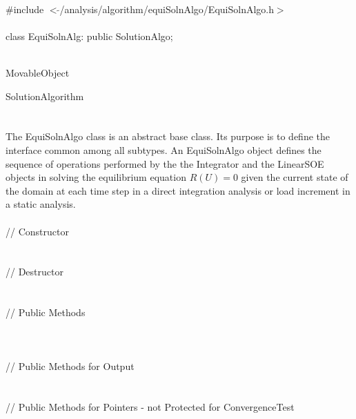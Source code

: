 
   \\
\indent \#include $<\tilde{
}$/analysis/algorithm/equiSolnAlgo/EquiSolnAlgo.h$>$  \\ 

  \\
class EquiSolnAlg: public SolutionAlgo;  


 \\
MovableObject 

\indent\indent SolutionAlgorithm \\
\indent\indent{} \\

 \\ 
\indent The EquiSolnAlgo class is an abstract base class. Its
purpose is to define the interface common among all subtypes. An
EquiSolnAlgo object defines the sequence of operations 
performed by the the Integrator and the LinearSOE objects in
solving the equilibrium equation $R(U) = 0$ given the current state of
the domain at each time step in a direct integration analysis or load
increment in a static analysis. \\

 \\ 
\indent\indent // Constructor  \\ 
\indent{}\\ \\
\indent\indent // Destructor  \\
\indent{}\\ \\
\indent\indent // Public Methods  \\
\indent{} \\
\indent{} \\ \\
\indent\indent // Public Methods for Output \\
\indent{}\\ \\
\indent\indent // Public Methods for Pointers - not Protected for ConvergenceTest\\
\indent{}
\\ 
\indent{} \\ 
\indent{} \\ 

